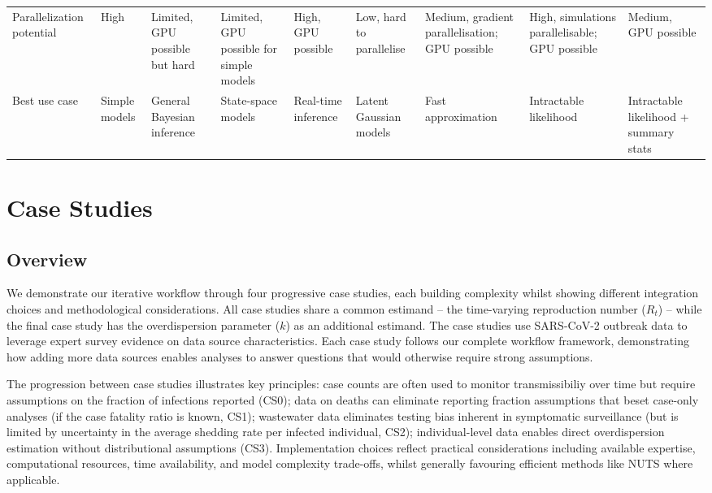 \documentclass{article}
\begin{document}
\begin{landscape}
\begin{table}[ht]
\begin{tabular}{@{}p{3.2cm}p{1.5cm}p{1.5cm}p{1.5cm}p{1.5cm}p{1.5cm}p{1.5cm}p{1.5cm}p{1.5cm}@{}}
Parallelization potential & 
High & 
Limited, GPU possible but hard & 
Limited, GPU possible for simple models & 
High, GPU possible & 
Low, hard to parallelise & 
Medium, gradient parallelisation; GPU possible & 
High, simulations parallelisable; GPU possible & 
Medium, GPU possible \\
Best use case & Simple models & General Bayesian inference & State-space models & Real-time inference & Latent Gaussian models & Fast approximation & Intractable likelihood & Intractable likelihood + summary stats \\
\bottomrule
\end{tabular}
\end{table}
\end{landscape}

\section{Case Studies}

\subsection{Overview}

We demonstrate our iterative workflow through four progressive case studies, each building complexity whilst showing different integration choices and methodological considerations.
All case studies share a common estimand -- the time-varying reproduction number ($R_t$) -- while the final case study has the overdispersion parameter ($k$) as an additional estimand. The case studies use SARS-CoV-2 outbreak data to leverage expert survey evidence on data source characteristics.
Each case study follows our complete workflow framework, demonstrating how adding more data sources enables analyses to answer questions that would otherwise require strong assumptions.

The progression between case studies illustrates key principles: case counts are often used to monitor transmissibiliy over time but require assumptions on the fraction of infections reported (CS0); data on deaths can eliminate reporting fraction assumptions that beset case-only analyses (if the case fatality ratio is known, CS1); wastewater data eliminates testing bias inherent in symptomatic surveillance (but is limited by uncertainty in the average shedding rate per infected individual, CS2); individual-level data enables direct overdispersion estimation without distributional assumptions (CS3).
Implementation choices reflect practical considerations including available expertise, computational resources, time availability, and model complexity trade-offs, whilst generally favouring efficient methods like NUTS where applicable.
\end{document}
